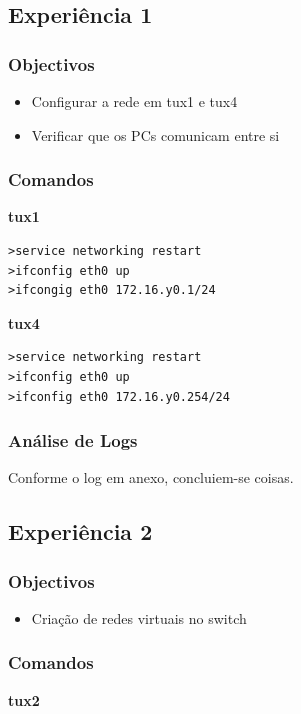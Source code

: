 \documentclass[a4paper,11pt]{article}
\begin{document}
\subsection{Experiência 1}
\subsubsection{Objectivos}
\begin{itemize}
\item Configurar a rede em tux1 e tux4
\item Verificar que os PCs comunicam entre si
\end{itemize}

\subsubsection{Comandos}

\textbf{tux1}
\lstset{showstringspaces=false,
		caption=,
		frame=tb}
		
\begin{lstlisting}
>service networking restart
>ifconfig eth0 up
>ifcongig eth0 172.16.y0.1/24
\end{lstlisting}

\textbf{tux4}

\begin{lstlisting}
>service networking restart
>ifconfig eth0 up
>ifconfig eth0 172.16.y0.254/24
\end{lstlisting}


\subsubsection{Análise de Logs}
Conforme o log em anexo, concluiem-se coisas.

\subsection{Experiência 2}
\subsubsection{Objectivos}

\begin{itemize}
\item Criação de redes virtuais no switch
\end{itemize}

\subsubsection{Comandos}
\textbf{tux2}
\end{document}

